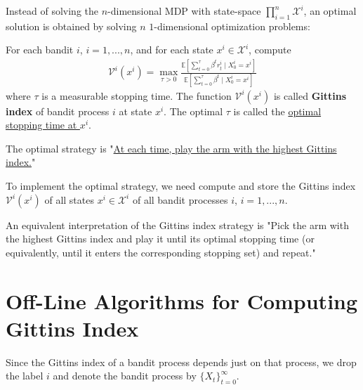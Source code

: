 \documentclass[11pt]{elegantbook}
\begin{document}
Instead of solving the $n$-dimensional MDP with state-space $\prod_{i=1}^n \mathcal{X}^i$, an optimal solution is obtained by solving $n$ $1$-dimensional
optimization problems:
\begin{definition}
    For each bandit $i$,
    $i = 1,..., n$, and for each state $x^i\in \mathcal{X}^i$, compute
    \begin{equation}
        \begin{aligned}
            \mathcal{V}^i(x^i)=\max_{\tau>0}\frac{\mathbb{E}\left[\sum_{t=0}^\tau\beta^tr^i_t\mid X^i_0=x^i\right]}{\mathbb{E}\left[\sum_{t=0}^\tau\beta^t\mid X^i_0=x^i\right]}
        \end{aligned}
        \nonumber
    \end{equation}
    where $\tau$ is a measurable stopping time. The function $\mathcal{V}^i(x^i)$ is called \textbf{Gittins index} of bandit process $i$ at state $x^i$. The optimal $\tau$ is called the \underline{optimal stopping time at $x^i$}.

    The optimal strategy is "\underline{At each time, play the arm with the highest Gittins index.}"
\end{definition}
To implement the optimal strategy, we need compute and store the Gittins index
$\mathcal{V}^i(x^i)$ of all states $x^i\in \mathcal{X}^i$ of all bandit processes $i$, $i = 1, ... , n$.

\begin{claim}
    An equivalent interpretation of the Gittins index strategy is {"Pick the arm with the highest Gittins index and play it until its optimal stopping time (or equivalently, until it enters the corresponding stopping set) and repeat."}
\end{claim}



\section{Off-Line Algorithms for Computing Gittins Index}
Since the Gittins index of a bandit process depends just on that process, we drop the label $i$ and denote the bandit process by
$\{X_t\}_{t=0}^\infty$.
\end{document}
